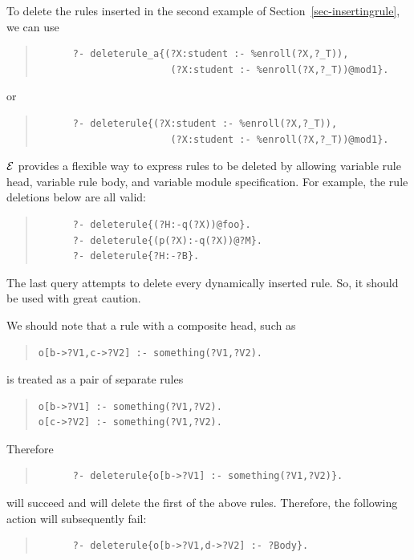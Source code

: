 \documentclass[11pt]{article}
\newcommand{\ERGO}{\mbox{\ensuremath{\cal{E}}\smaller{{\sc{RGO}}}}\xspace}
\newcommand{\FLSYSTEM}{\ERGO}
\begin{document}
To delete the rules inserted in the second example of
Section~\ref{sec-insertingrule}, we can use
\begin{quote}
\begin{verbatim}
      ?- deleterule_a{(?X:student :- %enroll(?X,?_T)),
                       (?X:student :- %enroll(?X,?_T))@mod1}.
\end{verbatim}
\end{quote}
or
\begin{quote}
\begin{verbatim}
      ?- deleterule{(?X:student :- %enroll(?X,?_T)),
                       (?X:student :- %enroll(?X,?_T))@mod1}.
\end{verbatim}
\end{quote}

\FLSYSTEM provides a flexible way to express rules to be deleted by
allowing variable rule head, variable rule body, and variable module
specification. For example, the rule deletions below are all valid:
\begin{quote}
\begin{verbatim}
      ?- deleterule{(?H:-q(?X))@foo}.
      ?- deleterule{(p(?X):-q(?X))@?M}.
      ?- deleterule{?H:-?B}.
\end{verbatim}
\end{quote}
The last query attempts to delete every dynamically inserted rule. So, it
should be used with great caution.

We should note that a rule with a composite head, such as 
\begin{quote}
   \begin{verbatim}
o[b->?V1,c->?V2] :- something(?V1,?V2).     
   \end{verbatim}
\end{quote}
is treated as a pair of separate rules
\begin{quote}
\begin{verbatim}
o[b->?V1] :- something(?V1,?V2).     
o[c->?V2] :- something(?V1,?V2).     
\end{verbatim}
\end{quote}
Therefore
\begin{quote}
\begin{verbatim}
      ?- deleterule{o[b->?V1] :- something(?V1,?V2)}.
\end{verbatim}
\end{quote}
will succeed and will delete the first of the above rules.
Therefore, the following action will subsequently fail:
\begin{quote}
\begin{verbatim}
      ?- deleterule{o[b->?V1,d->?V2] :- ?Body}.
\end{verbatim}
\end{quote}
\end{document}
